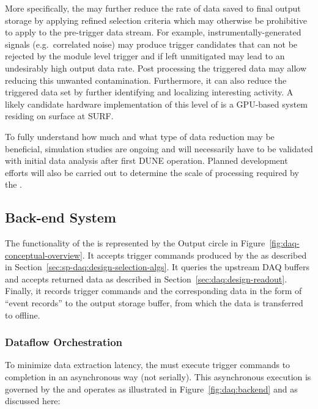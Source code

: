 More specifically, the  may further reduce the rate of data saved to final output storage by
applying refined selection criteria which may otherwise be prohibitive
to apply to the pre-trigger data stream.  For example, instrumentally-generated signals (e.g.~correlated noise)
may produce trigger candidates that can not be rejected by the module
level trigger and if left unmitigated may lead to an undesirably high
output data rate. 
Post processing the triggered data may allow reducing this unwanted
contamination.
Furthermore, it can also reduce the triggered data set by further identifying
and localizing interesting activity. A likely candidate hardware
implementation of this level of  is a GPU-based system
residing on surface at SURF.

To fully understand how much and what type of data reduction may be
beneficial, simulation studies are ongoing  and will
necessarily have to be
validated with initial data analysis after
first DUNE  operation. Planned 
development efforts will also be carried out to determine the scale of
processing required by the .


\subsection{Back-end System}
\label{sec:fd-daq:design-backend}

The functionality of the  is represented by the Output circle in Figure~\ref{fig:daq-conceptual-overview}. 
It accepts trigger commands produced by the  as described in Section~\ref{sec:sp-daq:design-selection-algs}. 
It queries the upstream DAQ buffers and accepts returned data as described in Section~\ref{sec:daq:design-readout}. 
Finally, it records trigger commands and the corresponding data in the
form of ``event records'' to the output storage buffer, from which the data is transferred to offline.

\subsubsection{Dataflow Orchestration}

To minimize data extraction latency, the  must execute
trigger commands to completion in an asynchronous way (not serially). 
This asynchronous execution is governed by the  and operates as illustrated in Figure~\ref{fig:daq:backend} and as discussed here:

